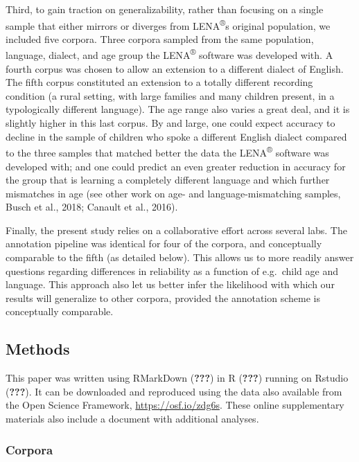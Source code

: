 \documentclass[english,table,man,floatsintext]{apa6}
\begin{document}
Third, to gain traction on generalizability, rather than focusing on a single sample that either mirrors or diverges from LENA\textsuperscript{®}s original population, we included five corpora. Three corpora sampled from the same population, language, dialect, and age group the LENA\textsuperscript{®} software was developed with. A fourth corpus was chosen to allow an extension to a different dialect of English. The fifth corpus constituted an extension to a totally different recording condition (a rural setting, with large families and many children present, in a typologically different language). The age range also varies a great deal, and it is slightly higher in this last corpus. By and large, one could expect accuracy to decline in the sample of children who spoke a different English dialect compared to the three samples that matched better the data the LENA\textsuperscript{®} software was developed with; and one could predict an even greater reduction in accuracy for the group that is learning a completely different language and which further mismatches in age (see other work on age- and language-mismatching samples, Busch et al., 2018; Canault et al., 2016).

Finally, the present study relies on a collaborative effort across several labs. The annotation pipeline was identical for four of the corpora, and conceptually comparable to the fifth (as detailed below). This allows us to more readily answer questions regarding differences in reliability as a function of e.g.~child age and language. This approach also let us better infer the likelihood with which our results will generalize to other corpora, provided the annotation scheme is conceptually comparable.

\hypertarget{methods}{%
\subsection{Methods}\label{methods}}

This paper was written using RMarkDown ({\textbf{???}}) in R ({\textbf{???}}) running on Rstudio ({\textbf{???}}). It can be downloaded and reproduced using the data also available from the Open Science Framework, \url{https://osf.io/zdg6s}. These online supplementary materials also include a document with additional analyses.

\hypertarget{corpora}{%
\subsubsection{Corpora}\label{corpora}}
\end{document}

